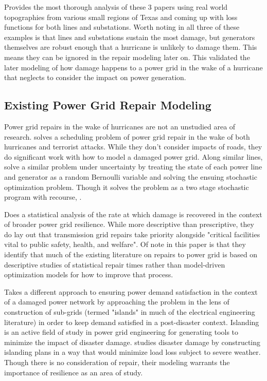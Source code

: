 \documentclass{article}
\begin{document}
		 \cite{WinklerEA2010} Provides the most thorough analysis of these 3 papers using real world topographies from various small regions of Texas and coming up with loss functions for both lines and substations. Worth noting in all three of these examples is that lines and substations sustain the most damage, but generators themselves are robust enough that a hurricane is unlikely to damage them. This means they can be ignored in the repair modeling later on. This validated the later modeling of how damage happens to a power grid in the wake of a hurricane that neglects to consider the impact on power generation.
	\subsection{Existing Power Grid Repair Modeling}
		Power grid repairs in the wake of hurricanes are not an unstudied area of research. \cite{NPSMasters} solves a scheduling problem of power grid repair in the wake of both hurricanes and terrorist attacks. While they don't consider impacts of roads, they do significant work with how to model a damaged power grid. Along similar lines, \cite{ArabEA2015} solve a similar problem under uncertainty by treating the state of each power line and generator as a random Bernoulli variable and solving the ensuing stochastic optimization problem. Though it solves the problem as a two stage stochastic program with recourse, . 
		
		\cite{OuyangEA2014} Does a statistical analysis of the rate at which damage is recovered in the context of broader power grid resilience. While more descriptive than prescriptive, they do lay out that transmission grid repairs take priority alongside "critical facilities vital to public safety, health, and welfare". Of note in this paper is that they identify that much of the existing literature on repairs to power grid is based on descriptive studies of statistical repair times rather than model-driven optimization models for how to improve that process.
		
		\cite{GolariEA2014} Takes a different approach to ensuring power demand satisfaction in the context of a damaged power network by approaching the problem in the lens of construction of sub-grids (termed "islands" in much of the electrical engineering literature) in order to keep demand satisfied in a post-disaster context. Islanding is an active field of study in power grid engineering for generating tools to minimize the impact of disaster damage. \cite{Panteli2016} studies disaster damage by constructing islanding plans in a way that would minimize load loss subject to severe weather. Though there is no consideration of repair, their modeling warrants the importance of resilience as an area of study.  
\end{document}
